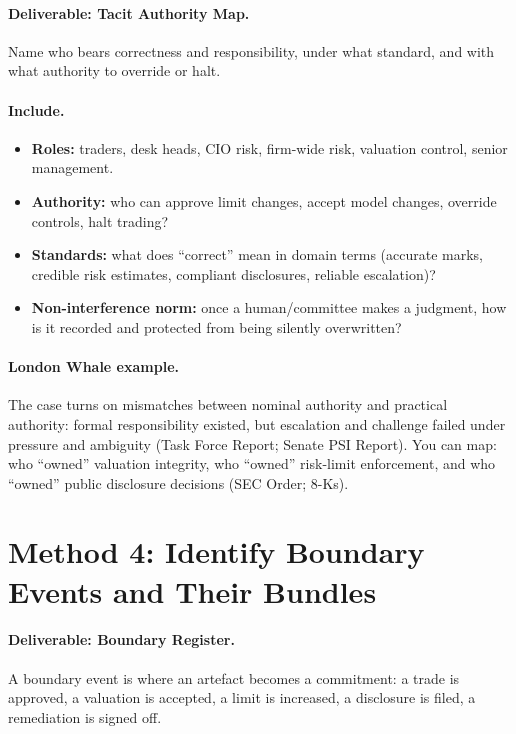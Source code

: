\paragraph{Deliverable: Tacit Authority Map.}
Name who bears correctness and responsibility, under what standard, and with what authority to override or halt.

\paragraph{Include.}
\begin{itemize}
  \item \textbf{Roles:} traders, desk heads, CIO risk, firm-wide risk, valuation control, senior management.
  \item \textbf{Authority:} who can approve limit changes, accept model changes, override controls, halt trading?
  \item \textbf{Standards:} what does “correct” mean in domain terms (accurate marks, credible risk estimates,
        compliant disclosures, reliable escalation)?
  \item \textbf{Non-interference norm:} once a human/committee makes a judgment, how is it recorded and protected from being silently overwritten?
\end{itemize}

\paragraph{London Whale example.}
The case turns on mismatches between nominal authority and practical authority: formal responsibility existed,
but escalation and challenge failed under pressure and ambiguity (Task Force Report; Senate PSI Report).
You can map: who “owned” valuation integrity, who “owned” risk-limit enforcement, and who “owned” public disclosure decisions (SEC Order; 8-Ks).

\section{Method 4: Identify Boundary Events and Their Bundles}
\label{sec:m4-boundaries}

\paragraph{Deliverable: Boundary Register.}
A boundary event is where an artefact becomes a commitment: a trade is approved, a valuation is accepted,
a limit is increased, a disclosure is filed, a remediation is signed off.

